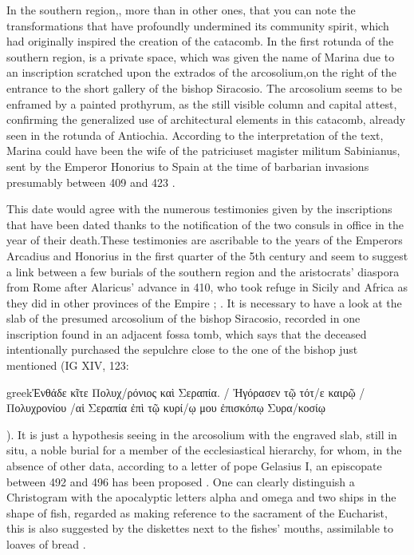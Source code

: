 \documentclass[amsthm,ebook]{saparticle}
\begin{document}
In the southern region,, more than in other ones, that you can note the transformations that have profoundly undermined its community spirit, which had originally inspired the creation of the catacomb. In the first rotunda of the southern region, is a private space, which was given the name of Marina due to an inscription scratched upon the extrados of the arcosolium,on the right of the entrance to the short gallery of the bishop Siracosio. The arcosolium seems to be enframed by a painted prothyrum, as the still visible column and capital attest, confirming the generalized use of architectural elements in this catacomb, already seen in the rotunda of Antiochia. According to the interpretation of the text, Marina could have been the wife of the patriciuset magister militum Sabinianus, sent by the Emperor Honorius to Spain at the time of barbarian invasions presumably between 409 and 423 \citep[21-22, 40]{FERRUA1989}.

This date would agree with the numerous testimonies given by the inscriptions that have been dated thanks to the notification of the two consuls in office in the year of their death.These testimonies are ascribable to the years of the Emperors Arcadius and Honorius in the first quarter of the 5th century and seem to suggest a link between a few burials of the southern region and the aristocrats’ diaspora from Rome after Alaricus’ advance in 410, who took refuge in Sicily and Africa as they did in other provinces of the Empire \citep[175]{SIRAGO1989}; %
. It is necessary to have a look at the slab of the presumed arcosolium of the bishop Siracosio, recorded in one inscription found in an adjacent fossa tomb, which says that the deceased intentionally purchased the sepulchre close to the one of the bishop just mentioned (IG XIV, 123: \begin{otherlanguage*}{greek}Ἐνθάδε κῖτε Πολυχ/ρόνιος καὶ Σεραπία. / Ἠγόρασεν τῷ τότ/ε καιρῷ / Πολυχρονίου /αἱ Σεραπία ἐπὶ τῷ κυρί/ῳ μου ἐπισκόπῳ Συρα/κοσίῳ\end{otherlanguage*}). It is just a hypothesis seeing in the arcosolium with the engraved slab, still in situ, a noble burial for a member of the ecclesiastical hierarchy, for whom, in the absence of other data, according to a letter of pope Gelasius I, an episcopate between 492 and 496 has been proposed \citep[223]{NARCISO1952} \citep{CARLETTI2008}. One can clearly distinguish a Christogram with the apocalyptic letters alpha and omega and two ships in the shape of fish, regarded as making reference to the sacrament of the Eucharist, this is also suggested by the diskettes next to the fishes’ mouths, assimilable to loaves of bread \citep{SGARLATA2013}.
\end{document}
